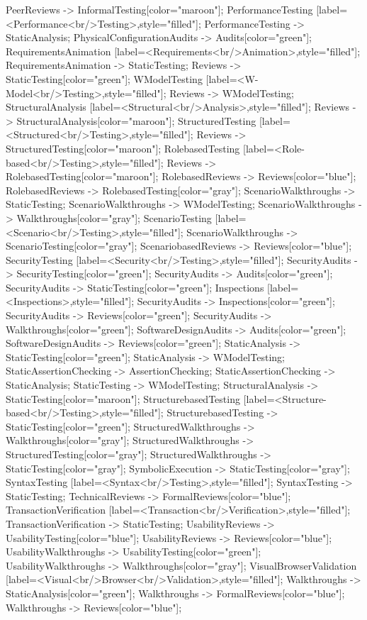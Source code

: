 \documentclass{article}
\begin{document}
{PeerReviews -> InformalTesting[color="maroon"];
PerformanceTesting [label=<Performance<br/>Testing>,style="filled"];
PerformanceTesting -> StaticAnalysis;
PhysicalConfigurationAudits -> Audits[color="green"];
RequirementsAnimation [label=<Requirements<br/>Animation>,style="filled"];
RequirementsAnimation -> StaticTesting;
Reviews -> StaticTesting[color="green"];
WModelTesting [label=<W-Model<br/>Testing>,style="filled"];
Reviews -> WModelTesting;
StructuralAnalysis [label=<Structural<br/>Analysis>,style="filled"];
Reviews -> StructuralAnalysis[color="maroon"];
StructuredTesting [label=<Structured<br/>Testing>,style="filled"];
Reviews -> StructuredTesting[color="maroon"];
RolebasedTesting [label=<Role-based<br/>Testing>,style="filled"];
Reviews -> RolebasedTesting[color="maroon"];
RolebasedReviews -> Reviews[color="blue"];
RolebasedReviews -> RolebasedTesting[color="gray"];
ScenarioWalkthroughs -> StaticTesting;
ScenarioWalkthroughs -> WModelTesting;
ScenarioWalkthroughs -> Walkthroughs[color="gray"];
ScenarioTesting [label=<Scenario<br/>Testing>,style="filled"];
ScenarioWalkthroughs -> ScenarioTesting[color="gray"];
ScenariobasedReviews -> Reviews[color="blue"];
SecurityTesting [label=<Security<br/>Testing>,style="filled"];
SecurityAudits -> SecurityTesting[color="green"];
SecurityAudits -> Audits[color="green"];
SecurityAudits -> StaticTesting[color="green"];
Inspections [label=<Inspections>,style="filled"];
SecurityAudits -> Inspections[color="green"];
SecurityAudits -> Reviews[color="green"];
SecurityAudits -> Walkthroughs[color="green"];
SoftwareDesignAudits -> Audits[color="green"];
SoftwareDesignAudits -> Reviews[color="green"];
StaticAnalysis -> StaticTesting[color="green"];
StaticAnalysis -> WModelTesting;
StaticAssertionChecking -> AssertionChecking;
StaticAssertionChecking -> StaticAnalysis;
StaticTesting -> WModelTesting;
StructuralAnalysis -> StaticTesting[color="maroon"];
StructurebasedTesting [label=<Structure-based<br/>Testing>,style="filled"];
StructurebasedTesting -> StaticTesting[color="green"];
StructuredWalkthroughs -> Walkthroughs[color="gray"];
StructuredWalkthroughs -> StructuredTesting[color="gray"];
StructuredWalkthroughs -> StaticTesting[color="gray"];
SymbolicExecution -> StaticTesting[color="gray"];
SyntaxTesting [label=<Syntax<br/>Testing>,style="filled"];
SyntaxTesting -> StaticTesting;
TechnicalReviews -> FormalReviews[color="blue"];
TransactionVerification [label=<Transaction<br/>Verification>,style="filled"];
TransactionVerification -> StaticTesting;
UsabilityReviews -> UsabilityTesting[color="blue"];
UsabilityReviews -> Reviews[color="blue"];
UsabilityWalkthroughs -> UsabilityTesting[color="green"];
UsabilityWalkthroughs -> Walkthroughs[color="gray"];
VisualBrowserValidation [label=<Visual<br/>Browser<br/>Validation>,style="filled"];
Walkthroughs -> StaticAnalysis[color="green"];
Walkthroughs -> FormalReviews[color="blue"];
Walkthroughs -> Reviews[color="blue"];

}
\end{document}
